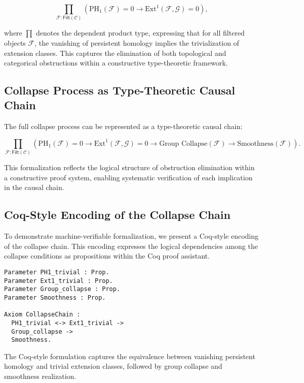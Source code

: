 \documentclass[11pt]{article}
\begin{document}
\[
\prod_{\mathcal{F} : \mathsf{Filt}(\mathcal{C})} 
\left( \mathrm{PH}_1(\mathcal{F}) = 0 \rightarrow \mathrm{Ext}^1(\mathcal{F}, \mathcal{G}) = 0 \right),
\]

where $\prod$ denotes the dependent product type, expressing that for all filtered objects $\mathcal{F}$, the vanishing of persistent homology implies the trivialization of extension classes. This captures the elimination of both topological and categorical obstructions within a constructive type-theoretic framework.

\subsection{Collapse Process as Type-Theoretic Causal Chain}

The full collapse process can be represented as a type-theoretic causal chain:

\[
\prod_{\mathcal{F} : \mathsf{Filt}(\mathcal{C})} 
\left( 
\mathrm{PH}_1(\mathcal{F}) = 0 \rightarrow \mathrm{Ext}^1(\mathcal{F}, \mathcal{G}) = 0 
\rightarrow \text{Group Collapse}(\mathcal{F}) 
\rightarrow \text{Smoothness}(\mathcal{F})
\right).
\]

This formalization reflects the logical structure of obstruction elimination within a constructive proof system, enabling systematic verification of each implication in the causal chain.

\subsection{Coq-Style Encoding of the Collapse Chain}

To demonstrate machine-verifiable formalization, we present a Coq-style encoding of the collapse chain. This encoding expresses the logical dependencies among the collapse conditions as propositions within the Coq proof assistant.

\begin{lstlisting}[language=Coq]
Parameter PH1_trivial : Prop.
Parameter Ext1_trivial : Prop.
Parameter Group_collapse : Prop.
Parameter Smoothness : Prop.

Axiom CollapseChain :
  PH1_trivial <-> Ext1_trivial ->
  Group_collapse ->
  Smoothness.
\end{lstlisting}

The Coq-style formulation captures the equivalence between vanishing persistent homology and trivial extension classes, followed by group collapse and smoothness realization.
\end{document}
